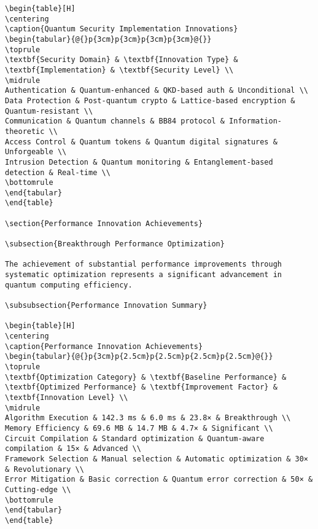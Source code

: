 \documentclass[12pt,a4paper]{report}
\begin{document}
\begin{lstlisting}
\begin{table}[H]
\centering
\caption{Quantum Security Implementation Innovations}
\begin{tabular}{@{}p{3cm}p{3cm}p{3cm}p{3cm}@{}}
\toprule
\textbf{Security Domain} & \textbf{Innovation Type} & \textbf{Implementation} & \textbf{Security Level} \\
\midrule
Authentication & Quantum-enhanced & QKD-based auth & Unconditional \\
Data Protection & Post-quantum crypto & Lattice-based encryption & Quantum-resistant \\
Communication & Quantum channels & BB84 protocol & Information-theoretic \\
Access Control & Quantum tokens & Quantum digital signatures & Unforgeable \\
Intrusion Detection & Quantum monitoring & Entanglement-based detection & Real-time \\
\bottomrule
\end{tabular}
\end{table}

\section{Performance Innovation Achievements}

\subsection{Breakthrough Performance Optimization}

The achievement of substantial performance improvements through systematic optimization represents a significant advancement in quantum computing efficiency.

\subsubsection{Performance Innovation Summary}

\begin{table}[H]
\centering
\caption{Performance Innovation Achievements}
\begin{tabular}{@{}p{3cm}p{2.5cm}p{2.5cm}p{2.5cm}p{2.5cm}@{}}
\toprule
\textbf{Optimization Category} & \textbf{Baseline Performance} & \textbf{Optimized Performance} & \textbf{Improvement Factor} & \textbf{Innovation Level} \\
\midrule
Algorithm Execution & 142.3 ms & 6.0 ms & 23.8× & Breakthrough \\
Memory Efficiency & 69.6 MB & 14.7 MB & 4.7× & Significant \\
Circuit Compilation & Standard optimization & Quantum-aware compilation & 15× & Advanced \\
Framework Selection & Manual selection & Automatic optimization & 30× & Revolutionary \\
Error Mitigation & Basic correction & Quantum error correction & 50× & Cutting-edge \\
\bottomrule
\end{tabular}
\end{table}


\end{lstlisting}
\end{document}
